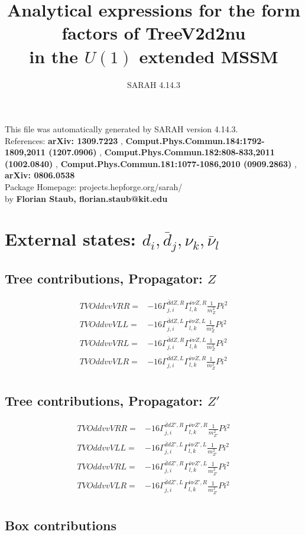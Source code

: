 \documentclass[A4,landscape]{article}
\begin{document}
\title{Analytical expressions for the form factors of TreeV2d2nu\\ in the $U(1)$ extended MSSM } 
 \author{SARAH 4.14.3} 
 \maketitle 
 \vspace{10cm} 
This file was automatically generated by SARAH version 4.14.3.  \\ 
References: {\bf arXiv: 1309.7223 }, {\bf Comput.Phys.Commun.184:1792-1809,2011 (1207.0906) }, {\bf Comput.Phys.Commun.182:808-833,2011 (1002.0840) }, {\bf Comput.Phys.Commun.181:1077-1086,2010 (0909.2863) }, {\bf arXiv: 0806.0538 } \\ 
Package Homepage: projects.hepforge.org/sarah/ \\ 
by {\bf Florian Staub, florian.staub@kit.edu} 
 \pagebreak 
 \tableofcontents 
 \pagebreak 
\section{External states: ${d_{{i}}, \bar{d}_{{j}}, \nu_{{k}}, \bar{\nu}_{{l}}}$} 
\subsection{Tree contributions, Propagator: $Z$} 

\begin{align} 
  TVOddvvVRR= & -16 \Gamma^{\bar{d}d Z ,R}_{j, i} \Gamma^{\bar{\nu}\nu Z ,R}_{l, k} \frac{1}{m^2_{Z}} Pi^2 \\ 
  TVOddvvVLL= & -16 \Gamma^{\bar{d}d Z ,L}_{j, i} \Gamma^{\bar{\nu}\nu Z ,L}_{l, k} \frac{1}{m^2_{Z}} Pi^2 \\ 
  TVOddvvVRL= & -16 \Gamma^{\bar{d}d Z ,R}_{j, i} \Gamma^{\bar{\nu}\nu Z ,L}_{l, k} \frac{1}{m^2_{Z}} Pi^2 \\ 
  TVOddvvVLR= & -16 \Gamma^{\bar{d}d Z ,L}_{j, i} \Gamma^{\bar{\nu}\nu Z ,R}_{l, k} \frac{1}{m^2_{Z}} Pi^2 \\ 
\end{align} 
\subsection{Tree contributions, Propagator: ${Z'}$} 

\begin{align} 
  TVOddvvVRR= & -16 \Gamma^{\bar{d}d {Z'} ,R}_{j, i} \Gamma^{\bar{\nu}\nu {Z'} ,R}_{l, k} \frac{1}{m^2_{{Z'}}} Pi^2 \\ 
  TVOddvvVLL= & -16 \Gamma^{\bar{d}d {Z'} ,L}_{j, i} \Gamma^{\bar{\nu}\nu {Z'} ,L}_{l, k} \frac{1}{m^2_{{Z'}}} Pi^2 \\ 
  TVOddvvVRL= & -16 \Gamma^{\bar{d}d {Z'} ,R}_{j, i} \Gamma^{\bar{\nu}\nu {Z'} ,L}_{l, k} \frac{1}{m^2_{{Z'}}} Pi^2 \\ 
  TVOddvvVLR= & -16 \Gamma^{\bar{d}d {Z'} ,L}_{j, i} \Gamma^{\bar{\nu}\nu {Z'} ,R}_{l, k} \frac{1}{m^2_{{Z'}}} Pi^2 \\ 
\end{align} 
\subsection{Box contributions} 
\end{document}
